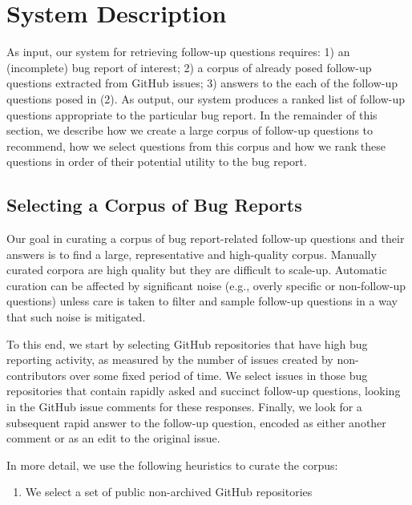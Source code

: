 \section{System Description}

As input, our system for retrieving follow-up questions requires: 1) an (incomplete) bug
report of interest; 2) a corpus of already posed follow-up questions extracted
from GitHub issues; 3) answers to the each of the follow-up questions posed in (2). As output, our system
produces a ranked list of follow-up questions appropriate to the particular bug report.
In the remainder of this section, we describe how we create a large corpus of follow-up questions
to recommend, how we select questions from this corpus and how we rank these questions in order
of their potential utility to the bug report.

\subsection{Selecting a Corpus of Bug Reports}

Our goal in curating a corpus of bug report-related follow-up questions and their answers
is to find a large, representative and high-quality corpus. Manually curated corpora are
high quality but they are difficult to scale-up. Automatic curation can be affected by
significant noise (e.g., overly specific or non-follow-up questions) unless care is taken
to filter and sample follow-up questions in a way that such noise is mitigated.

To this end, we start by selecting GitHub repositories that have high bug reporting activity,
as measured by the number of issues created by non-contributors over some fixed period of time.
We select issues in those bug repositories that contain rapidly asked and succinct follow-up
questions, looking in the GitHub issue comments for these responses. Finally, we look for
a subsequent rapid answer to the follow-up question, encoded as either another comment or as an edit to the
original issue.

In more detail, we use the following heuristics to curate the corpus:
\begin{enumerate}
\item We select a set of public non-archived GitHub repositories

\end{enumerate}


